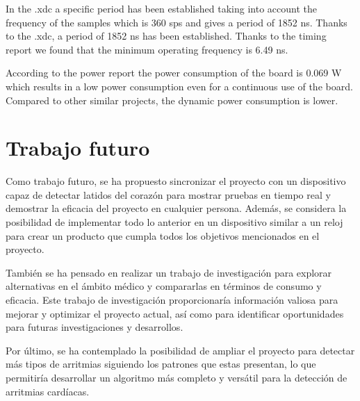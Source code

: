 In the .xdc a specific period has been established taking into account the frequency of the samples which is 360 sps and gives a period of 1852 ns. Thanks to the .xdc, a period of 1852 ns has been established. 
Thanks to the timing report we found that the minimum operating frequency is 6.49 ns.

According to the power report the power consumption of the board is 0.069 W which results in a low power consumption even for a continuous use of the board.
Compared to other similar projects, the dynamic power consumption is lower.


\chapter{Trabajo futuro}

Como trabajo futuro, se ha propuesto sincronizar el proyecto con un dispositivo capaz de detectar latidos del corazón para mostrar pruebas en tiempo real y demostrar la eficacia del proyecto en cualquier persona. Además, se considera la posibilidad de implementar todo lo anterior en un dispositivo similar a un reloj para crear un producto que cumpla todos los objetivos mencionados en el proyecto.

También se ha pensado en realizar un trabajo de investigación para explorar alternativas en el ámbito médico y compararlas en términos de consumo y eficacia. Este trabajo de investigación proporcionaría información valiosa para mejorar y optimizar el proyecto actual, así como para identificar oportunidades para futuras investigaciones y desarrollos.

Por último, se ha contemplado la posibilidad de ampliar el proyecto para detectar más tipos de arritmias siguiendo los patrones que estas presentan, lo que permitiría desarrollar un algoritmo más completo y versátil para la detección de arritmias cardíacas.
